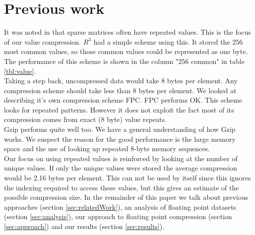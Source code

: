 \section{Previous work}
\label{sec:val}
It was noted in \cite{smac:kourtis} that sparse matrices often have repeated values. This is the focus of our value compression. $R^3$ had a simple scheme using this. It stored the 256 most common values, so those common values could be represented as one byte. The performance of this scheme is shown in the column "256 common" in table \ref{tbl:value}.\\
\indent Taking a step back, uncompressed data would take 8 bytes per element. Any compression scheme should take less than 8 bytes per element. We looked at \cite{smac:burtscher} describing it's own compression scheme FPC. FPC performs OK. This scheme looks for repeated patterns. However it does not exploit the fact most of its compression comes from exact (8 byte) value repeats.\\
\indent Gzip performs quite well too. We have a general understanding of how Gzip works. We suspect the reason for the good performance is the large memory space and the use of looking up repeated 8-byte memory sequences.\\
\indent Our focus on using repeated values is reinforced by looking at the number of unique values. If only the unique values were stored the average compression would be 2.16 bytes per element. This can not be used by itself since this ignores the indexing required to access these values, but this gives an estimate of the possible compression size.%
\indent In the remainder of this paper we talk about 
\ifshort
\else
previous approaches (section \ref{sec:relatedWork}), 
\fi
an analysis of floating point datasets (section \ref{sec:analysis}), our approach to floating point compression (section \ref{sec:approach}) and our results (section \ref{sec:results}).
